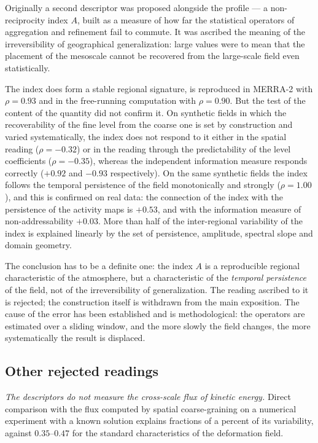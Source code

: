 \documentclass[11pt,a4paper]{article}
\begin{document}
Originally a second descriptor was proposed alongside the profile --- a non-reciprocity index $A$, built as a measure of how far the statistical operators of aggregation and refinement fail to commute. It was ascribed the meaning of the irreversibility of geographical generalization: large values were to mean that the placement of the mesoscale cannot be recovered from the large-scale field even statistically.

The index does form a stable regional signature, is reproduced in MERRA-2 with $\rho=0.93$ and in the free-running computation with $\rho=0.90$. But the test of the content of the quantity did not confirm it. On synthetic fields in which the recoverability of the fine level from the coarse one is set by construction and varied systematically, the index does not respond to it either in the spatial reading ($\rho=-0.32$) or in the reading through the predictability of the level coefficients ($\rho=-0.35$), whereas the independent information measure responds correctly ($+0.92$ and $-0.93$ respectively). On the same synthetic fields the index follows the temporal persistence of the field monotonically and strongly ($\rho=1.00$), and this is confirmed on real data: the connection of the index with the persistence of the activity maps is $+0.53$, and with the information measure of non-addressability $+0.03$. More than half of the inter-regional variability of the index is explained linearly by the set of persistence, amplitude, spectral slope and domain geometry.

The conclusion has to be a definite one: the index $A$ is a reproducible regional characteristic of the atmosphere, but a characteristic of the \emph{temporal persistence} of the field, not of the irreversibility of generalization. The reading ascribed to it is rejected; the construction itself is withdrawn from the main exposition. The cause of the error has been established and is methodological: the operators are estimated over a sliding window, and the more slowly the field changes, the more systematically the result is displaced.

\subsection{Other rejected readings}

\emph{The descriptors do not measure the cross-scale flux of kinetic energy.} Direct comparison with the flux computed by spatial coarse-graining \cite{Germano1992,Aluie2018} on a numerical experiment with a known solution explains fractions of a percent of its variability, against $0.35$--$0.47$ for the standard characteristics of the deformation field.
\end{document}
